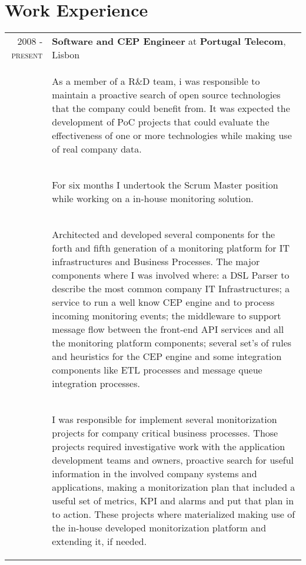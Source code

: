 \documentclass[a4paper,10pt]{article}
\begin{document}
\section{Work Experience}
\begin{tabular}{rp{11cm}}
  \textsc{2008 - present} & \textbf{Software and CEP Engineer} at \textbf{Portugal Telecom}, Lisbon\\ 
  & \begin{compactitem} 
     \item As a member of a R\&D team, i was responsible to maintain a proactive search of open source technologies that the company could benefit from. It was expected the development of PoC projects that could evaluate the effectiveness of one or more technologies while making use of real company data. 
     \end{compactitem}\vspace{-1em} \\
  & \begin{compactitem} 
     \item For six months I undertook the Scrum Master position while working on a in-house monitoring solution.
     \end{compactitem}\vspace{-1em} \\
  & \begin{compactitem}
     \item Architected and developed several components for the forth and fifth generation of a monitoring platform for IT infrastructures and Business Processes. The major components where I was involved where: a DSL Parser to describe the most common company IT Infrastructures; a service to run a well know CEP engine and to process incoming monitoring events; the middleware to support message flow between the front-end API services and all the monitoring platform components; several set's of rules and heuristics for the CEP engine and some integration components like ETL processes and message queue integration processes.
     \end{compactitem}\vspace{-1em} \\
  & \begin{compactitem} 
     \item I was responsible for implement several monitorization projects for company critical business processes. Those projects required investigative work with the application development teams and owners, proactive search for useful information in the involved company systems and applications, making a monitorization plan that included a useful set of metrics, KPI and alarms and put that plan in to action. These projects where materialized making use of the in-house developed monitorization platform and extending it, if needed.

\end{compactitem}
\end{tabular}
\end{document}
